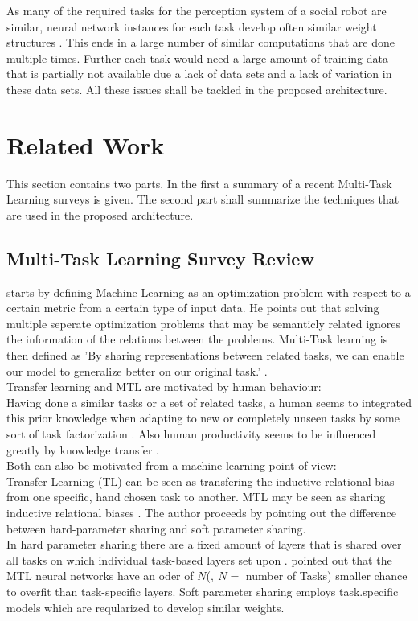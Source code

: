 As many of the required tasks for the perception system of a social robot are similar, neural network instances for each task develop often similar weight structures \cite{pratt1993transferring}. 
This ends in a large number of similar computations that are done multiple times.
Further each task would need a large amount of training data that is partially not available due a lack of data sets and a lack of variation in these data sets. 
All these issues shall be tackled in the proposed architecture. 
\newpage
\section{Related Work}
This section contains two parts. In the first a summary of a recent Multi-Task Learning surveys is given. 
The second part shall summarize the techniques that are used in the proposed architecture. 


\subsection{Multi-Task Learning Survey Review}
\cite{DBLP:journals/corr/Ruder17a} starts by defining Machine Learning as an optimization problem with respect to a certain metric from a certain type of input data. He points out that solving multiple seperate optimization problems that may be semanticly related ignores the information of the relations between the problems. Multi-Task learning is then defined as 'By sharing representations between related tasks, we can enable our model to generalize better on our original task.' \cite{DBLP:journals/corr/Ruder17a}. \\
Transfer learning and MTL are motivated by human behaviour: \\
Having done a similar tasks or a set of related tasks, a human seems to integrated this prior knowledge when adapting to new or completely unseen tasks by some sort of task factorization \cite{FleschE10313}. Also human productivity seems to be influenced greatly by knowledge transfer \cite{argote2000knowledge}. \\
Both can also be motivated from a machine learning point of view: \\
Transfer Learning (TL) can be seen as transfering the inductive relational bias from one specific, hand chosen task to another. MTL may be seen as sharing inductive relational biases \cite{Caruana1997}\cite{battaglia2018relational}\cite{DBLP:journals/corr/abs-1106-0245}\cite{Caruana1993MultitaskLA}. 
The author proceeds by pointing out the difference between hard-parameter sharing and soft parameter sharing. \\
In hard parameter sharing there are a fixed amount of layers that is shared over all tasks on which individual task-based layers set upon \cite{Caruana1997}. 
\cite{Baxter1997} pointed out that the MTL neural networks have an oder of $N$($, \ N =$ number of Tasks) smaller chance to overfit than task-specific layers.
Soft parameter sharing employs task.specific models which are reqularized to develop similar weights.


